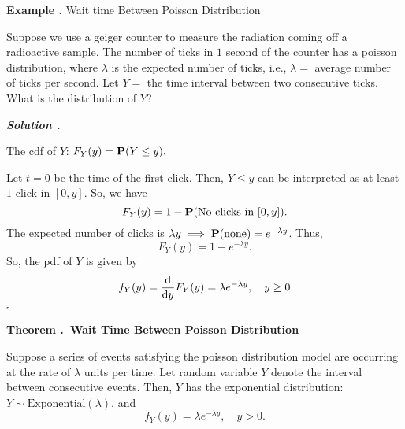 \documentclass[12pt, a4paper]{article}
\newcounter{index}[subsection]
\newenvironment*{eg}{\begin{framed}\par\noindent\textbf{Example \thesubsection.\stepcounter{index}\theindex}}{\par\end{framed}}
\newenvironment*{thm}[1]{\begin{tcolorbox}\par\noindent\textbf{Theorem \thesubsection.\stepcounter{index}\theindex\ #1} \par}{\par\end{tcolorbox}}
\newcounter{nprf}[subsection]
\newenvironment*{sol}{\par\indent\textbf{\textit{Solution \stepcounter{nprf}\thenprf.}}\par}{\hfill{$\square$}\par}
\def\P{\vb{P}}
\begin{document}
\begin{eg}
	Wait time Between Poisson Distribution\par Suppose we use a geiger counter to measure the radiation coming off a radioactive sample. The number of ticks in $1$ second of the counter has a poisson distribution, where $\lambda$ is the expected number of ticks, i.e., $\lambda=$ average number of ticks per second. Let $Y=$ the time interval between two consecutive ticks. What is the distribution of $Y$? 
	\begin{sol}
		The cdf of $Y$: $F_Y(y)=\P(Y\leq y).$\par Let $t=0$ be the time of the first click. Then, $Y\leq y$ can be interpreted as at least $1$ click in $[0,y]$. So, we have \[F_Y(y)=1-\P(\text{No clicks in }[0,y]).\] The expected number of clicks is $\lambda y\implies\P(\text{none})=e^{-\lambda y}$. Thus, \[F_Y(y)=1-e^{-\lambda y}.\] So, the pdf of $Y$ is given by \[f_Y(y)=\dv{y}F_Y(y)=\lambda e^{-\lambda y},\quad y\geq0\]
	\end{sol}
\end{eg}
\begin{thm}{Wait Time Between Poisson Distribution}
	Suppose a series of events satisfying the poisson distribution	model are occurring at the rate of $\lambda$ units per time. Let random variable $Y$ denote the interval between consecutive events. Then, $Y$ has the exponential distribution: $Y\sim\text{Exponential}(\lambda)$, and \[f_Y(y)=\lambda e^{-\lambda y},\quad y>0.\]
\end{thm}
\end{document}
